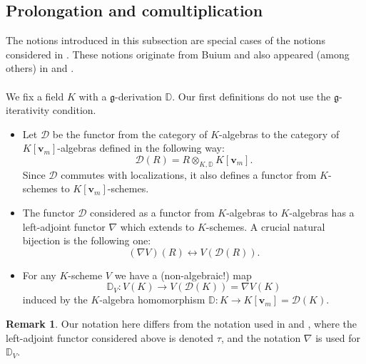 \documentclass[10pt]{amsart}
\theoremstyle{definition}
\newtheorem{remark}[theorem]{Remark}
\begin{document}
\subsection{Prolongation and comultiplication}\label{secproco}
The notions introduced in this subsection are special cases of the notions considered in \cite{MS}. These notions originate from Buium \cite{Bui2} and also appeared (among others) in \cite{PiZie} and \cite{KP5}.
\\
\\
We fix a field $K$ with a $\mathfrak{g}$-derivation $\mathbb{D}$. Our first definitions do not use the $\mathfrak{g}$-iterativity condition.
\begin{itemize}
\item Let $\mathcal{D}$ be the functor from the category of $K$-algebras to the category of $K[\mathbf{v}_m]$-algebras defined in the following way:
$$\mathcal{D}(R)=R\otimes_{K,\mathbb{D}}K[\mathbf{v}_m].$$
Since $\mathcal{D}$ commutes with localizations, it also defines a functor from $K$-schemes to $K[\mathbf{v}_m]$-schemes.

\item The functor $\mathcal{D}$ considered as a functor from $K$-algebras to $K$-algebras has a left-adjoint functor $\nabla$ which extends to $K$-schemes. A crucial natural bijection is the following one:
    $$(\nabla V)(R)\longleftrightarrow V(\mathcal{D}(R)).$$


\item For any $K$-scheme $V$ we have a (non-algebraic!) map
$$\mathbb{D}_{V}:V(K)\to V(\mathcal{D}(K))=\nabla V(K)$$
induced by the $K$-algebra homomorphism $\mathbb{D}:K\to K[\mathbf{v}_m]=\mathcal{D}(K)$.
\end{itemize}
\begin{remark}
Our notation here differs from the notation used in \cite{Bui2} and \cite{MS}, where the left-adjoint functor considered above is denoted $\tau$, and the  notation $\nabla$ is used for $\mathbb{D}_{V}$.
\end{remark}
\end{document}
